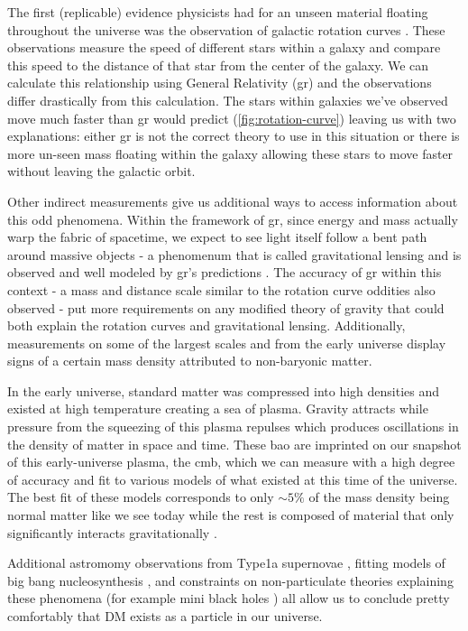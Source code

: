 The first (replicable) evidence physicists had for an unseen material floating throughout the universe was the
observation of galactic rotation curves \cite{rubin-rotationcurve-1980,rotationcurve-2000}. These
observations measure the speed of different stars within a galaxy and compare this speed to the
distance of that star from the center of the galaxy. We can calculate this relationship using
General Relativity (\ac{gr}) \cite{rotationcurve-predictions-2007} and the observations differ drastically from this
calculation. The stars within galaxies we've observed move much faster than \ac{gr} would predict
(\cref{fig:rotation-curve}) leaving us with two explanations: either \ac{gr} is not the correct
theory to use in this situation or there is more un-seen mass floating within the galaxy allowing
these stars to move faster without leaving the galactic orbit.

Other indirect measurements give us additional ways to access information about this odd phenomena.
Within the framework of \ac{gr}, since energy and mass actually warp the fabric of spacetime, we
expect to see light itself follow a bent path around massive objects - a phenomenum that is called
gravitational lensing and is observed and well modeled by \ac{gr}'s predictions \cite{gravlensing-2004}.
The accuracy of \ac{gr} within this context - a mass and distance scale similar to the rotation
curve oddities also observed - put more requirements on any modified theory of gravity that could
both explain the rotation curves and gravitational lensing. Additionally, measurements on some of
the largest scales and from the early universe display signs of a certain mass density attributed
to non-baryonic matter. 

In the early universe, standard matter was compressed into high densities and existed at high
temperature creating a sea of plasma. Gravity attracts while pressure from the squeezing of this
plasma repulses which produces oscillations in the density of matter in space and time.
These \ac{bao} are imprinted on our snapshot of this early-universe plasma, the 
\ac{cmb}, which we can measure with a high degree
of accuracy and fit to various models of what existed at this time of the universe. The best fit of
these models corresponds to only $\sim 5\%$ of the mass density being normal matter like we see
today while the rest is composed of material that only significantly interacts gravitationally
\cite{planck-cmb-2015}.

Additional astromomy observations from Type1a supernovae \cite{type1a-supernova-2010}, fitting
models of big bang nucleosynthesis \cite{nucleosynthesis-1998}, and constraints on non-particulate
theories explaining these phenomena (for example mini black holes
\cite{constraints-primordial-black-holes-2021})
all allow us to conclude pretty comfortably that DM exists as a particle in our universe.

